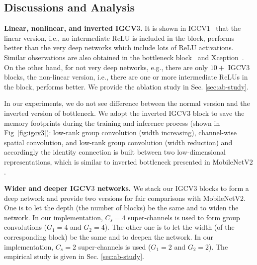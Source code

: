 \documentclass{bmvc2k}
\begin{document}
	\subsection{Discussions and Analysis}
	\noindent\textbf{Linear, nonlinear, and inverted IGCV$3$.} 
	It is shown in IGCV$1$~\cite{zhang2017interleaved}
	that the linear version,
	i.e., no intermediate ReLU is included in the block,
	performs better than the very deep networks
	which include lots of ReLU activations.
	Similar observations are also obtained
	in the bottleneck block~\cite{he2016deep} and Xception~\cite{Chollet16a}.
	On the other hand, for not very deep networks,
	e.g., there are only $10+$ IGCV$3$ blocks,
	the non-linear version, i.e., 
	there are one or more intermediate ReLUs in the block,  
	performs better. 
	We provide the ablation study in Sec. \ref{sec:ab-study}. 
	
	In our experiments, we do not see difference between the normal version and the inverted version of bottleneck. We adopt the inverted IGCV$3$ block to save the memory footprints during the training and inference process (shown in Fig~\ref{fig:igcv3}):
	low-rank group convolution (width increasing),
	channel-wise spatial convolution,
	and low-rank group convolution (width reduction)
	and accordingly the identity connection is built between two low-dimensional representations, which is similar to inverted bottleneck presented in MobileNetV$2$ \cite{sandler2018inverted}.
	
	\noindent\textbf{Wider and deeper IGCV$3$ networks.} 
	We stack our IGCV$3$ blocks to form a deep network and provide two versions for fair comparisons with MobileNetV$2$.
	One is to let the depth (the number of blocks) be the same and to 
	widen the network. In our implementation, 
	$C_s=4$ super-channels is used to form group convolutions ($G_1=4$ and $G_2=4$).
	The other one is to let the width (of the corresponding block) be the same 
	and to deepen the network. 
	In our implementation, $C_s = 2$ super-channels is used ($G_1=2$ and $G_2=2$).
	The empirical study is given in Sec. \ref{sec:ab-study}.
	
\end{document}
